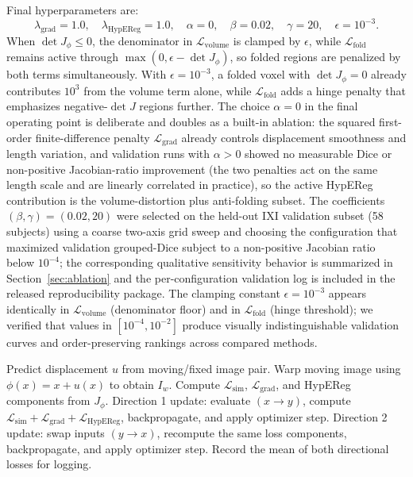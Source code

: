 \documentclass[jimaging,article,submit,pdftex,moreauthors]{Definitions/mdpi}
\begin{document}
Final hyperparameters are:
\[
\lambda_{\mathrm{grad}} = 1.0, \quad
\lambda_{\mathrm{HypEReg}} = 1.0, \quad
\alpha = 0, \quad
\beta = 0.02, \quad
\gamma = 20, \quad
\epsilon = 10^{-3}.
\]
When \(\det J_\phi \le 0\), the denominator in \(\mathcal{L}_{\mathrm{volume}}\) is clamped by \(\epsilon\), while \(\mathcal{L}_{\mathrm{fold}}\) remains active through \(\max(0,\epsilon-\det J_\phi)\), so folded regions are penalized by both terms simultaneously. With \(\epsilon=10^{-3}\), a folded voxel with \(\det J_\phi=0\) already contributes \(10^3\) from the volume term alone, while \(\mathcal{L}_{\mathrm{fold}}\) adds a hinge penalty that emphasizes negative-\(\det J\) regions further. The choice \(\alpha=0\) in the final operating point is deliberate and doubles as a built-in ablation: the squared first-order finite-difference penalty \(\mathcal{L}_{\mathrm{grad}}\) already controls displacement smoothness and length variation, and validation runs with \(\alpha>0\) showed no measurable Dice or non-positive Jacobian-ratio improvement (the two penalties act on the same length scale and are linearly correlated in practice), so the active HypEReg contribution is the volume-distortion plus anti-folding subset. The coefficients \((\beta,\gamma)=(0.02,20)\) were selected on the held-out IXI validation subset (58 subjects) using a coarse two-axis grid sweep and choosing the configuration that maximized validation grouped-Dice subject to a non-positive Jacobian ratio below \(10^{-4}\); the corresponding qualitative sensitivity behavior is summarized in Section~\ref{sec:ablation} and the per-configuration validation log is included in the released reproducibility package. The clamping constant \(\epsilon=10^{-3}\) appears identically in \(\mathcal{L}_{\mathrm{volume}}\) (denominator floor) and in \(\mathcal{L}_{\mathrm{fold}}\) (hinge threshold); we verified that values in \([10^{-4},10^{-2}]\) produce visually indistinguishable validation curves and order-preserving rankings across compared methods.

\begin{algorithm}[H]
\caption{HypEReg-TransMorph training step (per mini-batch)}
\begin{algorithmic}[1]
\State Predict displacement $u$ from moving/fixed image pair.
\State Warp moving image using $\phi(x)=x+u(x)$ to obtain $I_w$.
\State Compute $\mathcal{L}_{\mathrm{sim}}$, $\mathcal{L}_{\mathrm{grad}}$, and HypEReg components from $J_\phi$.
\State Direction 1 update: evaluate $(x\rightarrow y)$, compute $\mathcal{L}_{\mathrm{sim}}+\mathcal{L}_{\mathrm{grad}}+\mathcal{L}_{\mathrm{HypEReg}}$, backpropagate, and apply optimizer step.
\State Direction 2 update: swap inputs $(y\rightarrow x)$, recompute the same loss components, backpropagate, and apply optimizer step.
\State Record the mean of both directional losses for logging.
\end{algorithmic}
\end{algorithm}
\end{document}
